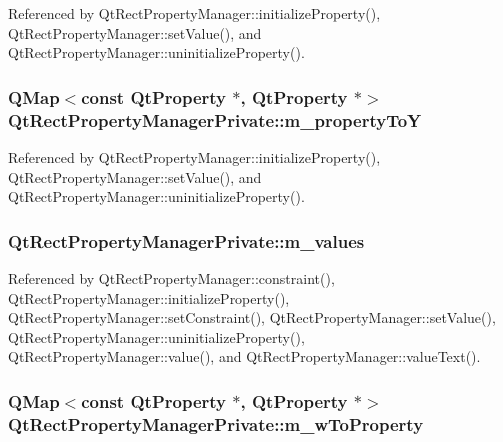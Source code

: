 Referenced by Qt\+Rect\+Property\+Manager\+::initialize\+Property(), Qt\+Rect\+Property\+Manager\+::set\+Value(), and Qt\+Rect\+Property\+Manager\+::uninitialize\+Property().

\subsubsection[{m\+\_\+property\+ToY}]{\setlength{\rightskip}{0pt plus 5cm}Q\+Map$<$const {\bf Qt\+Property} $\ast$, {\bf Qt\+Property} $\ast$$>$ Qt\+Rect\+Property\+Manager\+Private\+::m\+\_\+property\+ToY}\label{classQtRectPropertyManagerPrivate_aaee75c28d0962d7d7b89a3e60a9e79a6}


Referenced by Qt\+Rect\+Property\+Manager\+::initialize\+Property(), Qt\+Rect\+Property\+Manager\+::set\+Value(), and Qt\+Rect\+Property\+Manager\+::uninitialize\+Property().

\subsubsection[{m\+\_\+values}]{ Qt\+Rect\+Property\+Manager\+Private\+::m\+\_\+values}\label{classQtRectPropertyManagerPrivate_a16f84925b5da327b2834db96485fc072}


Referenced by Qt\+Rect\+Property\+Manager\+::constraint(), Qt\+Rect\+Property\+Manager\+::initialize\+Property(), Qt\+Rect\+Property\+Manager\+::set\+Constraint(), Qt\+Rect\+Property\+Manager\+::set\+Value(), Qt\+Rect\+Property\+Manager\+::uninitialize\+Property(), Qt\+Rect\+Property\+Manager\+::value(), and Qt\+Rect\+Property\+Manager\+::value\+Text().

\subsubsection[{m\+\_\+w\+To\+Property}]{\setlength{\rightskip}{0pt plus 5cm}Q\+Map$<$const {\bf Qt\+Property} $\ast$, {\bf Qt\+Property} $\ast$$>$ Qt\+Rect\+Property\+Manager\+Private\+::m\+\_\+w\+To\+Property}\label{classQtRectPropertyManagerPrivate_aa135692194a90d1e454338f692dfdfff}


